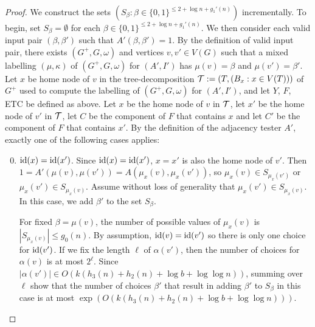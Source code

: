 \begin{proof}

  We construct the sets $(S_\beta:\beta\in\{0,1\}^{\le 2+\log n+g_1'(n)})$ incrementally.  To begin, set $S_\beta=\emptyset$ for each $\beta\in\{0,1\}^{\le 2+\log n+g_1'(n)}$.  We then consider each valid input pair $(\beta,\beta')$ such that $A'(\beta,\beta')=1$.  By the definition of valid input pair, there exists $(G^+,G,\omega)$ and vertices $v,v'\in V(G)$ such that a mixed labelling $(\mu,\kappa)$ of $(G^+,G,\omega)$ for $(A',I')$ has $\mu(v)=\beta$ and $\mu(v')=\beta'$.  Let $x$ be home node of $v$ in the tree-decomposition $\mathcal{T}:=(T,(B_x:x\in V(T)))$ of $G^+$ used to compute the labelling of $(G^+,G,\omega)$ for $(A',I')$, and let $Y$, $F$, ETC be defined as above.  Let $x$ be the home node of $v$ in $\mathcal{T}$, let $x'$ be the home node of $v'$ in $\mathcal{T}$, let $C$ be the component of $F$ that contains $x$ and let $C'$ be the component of $F$ that contains $x'$.  By the definition of the adjacency tester $A'$, exactly one of the following cases applies:
  \begin{enumerate}\setcounter{enumi}{-1}
    \item $\operatorname{id}(x)=\operatorname{id}(x')$. Since $\operatorname{id}(x)=\operatorname{id}(x')$, $x=x'$ is also the home node of $v'$.  Then $1=A'(\mu(v),\mu(v'))=A(\mu_x(v),\mu_x(v'))$, so $\mu_x(v)\in S_{\mu_x(v')}$ or $\mu_x(v')\in S_{\mu_x(v)}$.  Assume without loss of generality that $\mu_x(v')\in S_{\mu_x(v)}$.  In this case, we add $\beta'$ to the set $S_\beta$.  
    
    For fixed $\beta=\mu(v)$, the number of possible values of $\mu_x(v)$ is $|S_{\mu_x(v)}|\le g_0(n)$. By assumption, $\operatorname{id}(v)=\operatorname{id}(v')$ so there is only one choice for $\operatorname{id}(v')$.  If we fix the length $\ell$ of $\alpha(v')$, then the number of choices for $\alpha(v)$ is at most $2^\ell$.  Since $|\alpha(v')|\in O(k(h_3(n)+h_2(n)+\log b+\log\log n))$, summing over $\ell$ show that the number of choices $\beta'$ that result in adding $\beta'$ to $S_\beta$ in this case is at most $\exp(O(k(h_3(n)+h_2(n)+\log b+\log\log n)))$.
    

\end{enumerate}
\end{proof}

